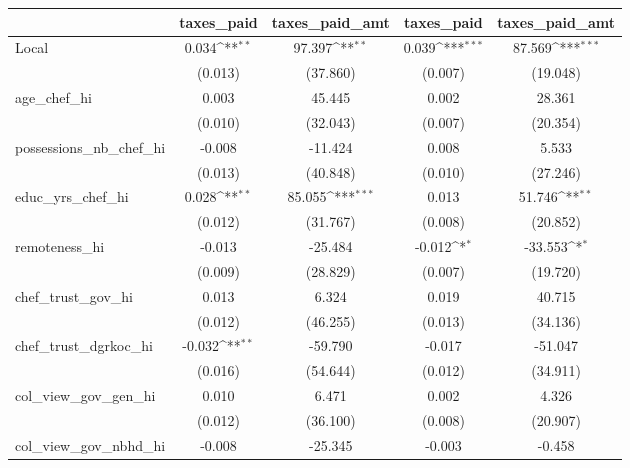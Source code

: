 {
\def\sym#1{\ifmmode^{#1}\else\(^{#1}\)\fi}
\begin{tabular}{l*{4}{c}}
\hline\hline
                &\multicolumn{1}{c}{taxes\_paid}&\multicolumn{1}{c}{taxes\_paid\_amt}&\multicolumn{1}{c}{taxes\_paid}&\multicolumn{1}{c}{taxes\_paid\_amt}\\
\hline
Local           &    0.034\sym{**} &   97.397\sym{**} &    0.039\sym{***}&   87.569\sym{***}\\
                &  (0.013)         & (37.860)         &  (0.007)         & (19.048)         \\
age\_chef\_hi     &    0.003         &   45.445         &    0.002         &   28.361         \\
                &  (0.010)         & (32.043)         &  (0.007)         & (20.354)         \\
possessions\_nb\_chef\_hi&   -0.008         &  -11.424         &    0.008         &    5.533         \\
                &  (0.013)         & (40.848)         &  (0.010)         & (27.246)         \\
educ\_yrs\_chef\_hi&    0.028\sym{**} &   85.055\sym{***}&    0.013         &   51.746\sym{**} \\
                &  (0.012)         & (31.767)         &  (0.008)         & (20.852)         \\
remoteness\_hi   &   -0.013         &  -25.484         &   -0.012\sym{*}  &  -33.553\sym{*}  \\
                &  (0.009)         & (28.829)         &  (0.007)         & (19.720)         \\
chef\_trust\_gov\_hi&    0.013         &    6.324         &    0.019         &   40.715         \\
                &  (0.012)         & (46.255)         &  (0.013)         & (34.136)         \\
chef\_trust\_dgrkoc\_hi&   -0.032\sym{**} &  -59.790         &   -0.017         &  -51.047         \\
                &  (0.016)         & (54.644)         &  (0.012)         & (34.911)         \\
col\_view\_gov\_gen\_hi&    0.010         &    6.471         &    0.002         &    4.326         \\
                &  (0.012)         & (36.100)         &  (0.008)         & (20.907)         \\
col\_view\_gov\_nbhd\_hi&   -0.008         &  -25.345         &   -0.003         &   -0.458         \\

\end{tabular}}
